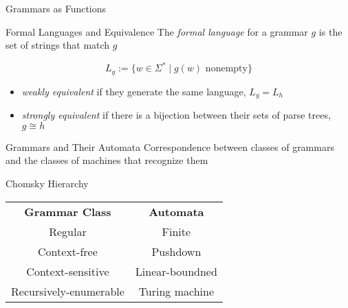 \documentclass[10pt]{beamer}
\begin{document}
\begin{frame}{Grammars as Functions}
\begin{minipage}[t]{.6\textwidth}
  \end{minipage}%
\end{frame}

\begin{frame}{Formal Languages and Equivalence}
  The \emph{formal language} for a grammar $g$ is the set of strings that match $g$

  \[
    L_{g} := \{ w \in \Sigma^{*} \mid g(w) \text{ nonempty}\}
  \]

  \begin{itemize}
    \item<3-> \emph{weakly equivalent} if they generate the same language, $L_{g} = L_{h}$
    \item<4-> \emph{strongly equivalent} if there is a bijection between their sets of parse trees, $g \cong h$
  \end{itemize}

\end{frame}

\begin{frame}{Grammars and Their Automata}
  Correspondence between classes of grammars and the classes of machines that recognize them

  \begin{block}{Chomsky Hierarchy}
  \begin{center}
    \begin{tabular}{c c}
      \textbf{Grammar Class} & \textbf{Automata} \\
      Regular & Finite \\
      Context-free & Pushdown \\
      Context-sensitive & Linear-boundned \\
      Recursively-enumerable & Turing machine
    \end{tabular}
  \end{center}
  \end{block}
\end{frame}
\end{document}
